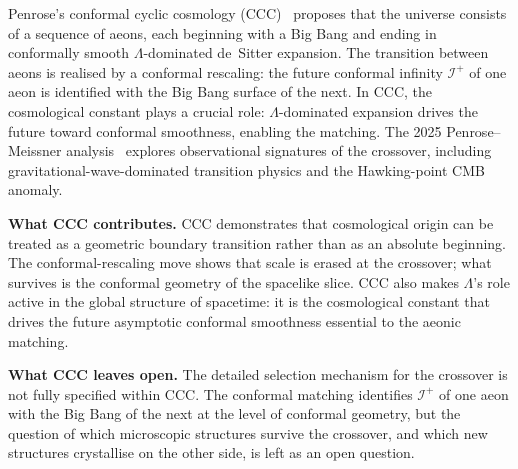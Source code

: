 \documentclass[11pt]{article}
\theoremstyle{plain}
\theoremstyle{definition}
\theoremstyle{remark}
\begin{document}
Penrose's conformal cyclic cosmology (CCC)~\citep{Penrose2010, GurzadyanPenrose2013, PenroseMeissner2025} proposes that the universe consists of a sequence of aeons, each beginning with a Big Bang and ending in conformally smooth $\Lambda$-dominated de~Sitter expansion. The transition between aeons is realised by a conformal rescaling: the future conformal infinity $\mathscr{I}^+$ of one aeon is identified with the Big Bang surface of the next. In CCC, the cosmological constant plays a crucial role: $\Lambda$-dominated expansion drives the future toward conformal smoothness, enabling the matching. The 2025 Penrose--Meissner analysis~\citep{PenroseMeissner2025} explores observational signatures of the crossover, including gravitational-wave-dominated transition physics and the Hawking-point CMB anomaly.

\medskip
\noindent\textbf{What CCC contributes.} CCC demonstrates that cosmological origin can be treated as a geometric boundary transition rather than as an absolute beginning. The conformal-rescaling move shows that scale is erased at the crossover; what survives is the conformal geometry of the spacelike slice. CCC also makes $\Lambda$'s role active in the global structure of spacetime: it is the cosmological constant that drives the future asymptotic conformal smoothness essential to the aeonic matching.

\medskip
\noindent\textbf{What CCC leaves open.} The detailed selection mechanism for the crossover is not fully specified within CCC. The conformal matching identifies $\mathscr{I}^+$ of one aeon with the Big Bang of the next at the level of conformal geometry, but the question of which microscopic structures survive the crossover, and which new structures crystallise on the other side, is left as an open question.
\end{document}
